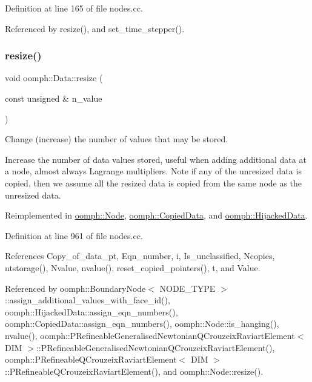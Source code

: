 Definition at line 165 of file nodes.\+cc.



Referenced by resize(), and set\+\_\+time\+\_\+stepper().

\mbox{\label{classoomph_1_1Data_ac68583834c9bef47f5c37c890960e186}} 
\subsubsection{\texorpdfstring{resize()}{resize()}}
{\footnotesize\ttfamily void oomph\+::\+Data\+::resize (\begin{DoxyParamCaption}\item[{const unsigned \&}]{n\+\_\+value }\end{DoxyParamCaption})\hspace{0.3cm}{\ttfamily [virtual]}}



Change (increase) the number of values that may be stored. 

Increase the number of data values stored, useful when adding additional data at a node, almost always Lagrange multipliers. Note if any of the unresized data is copied, then we assume all the resized data is copied from the same node as the unresized data. 

Reimplemented in \hyperlink{classoomph_1_1Node_ae6598da29d403889020ccd47a2c07cc4}{oomph\+::\+Node}, \hyperlink{classoomph_1_1CopiedData_aa7c48fb5ea17cd42260965bf2c800b3d}{oomph\+::\+Copied\+Data}, and \hyperlink{classoomph_1_1HijackedData_ae2ae3e860b36b40c133d56aae5fc39a3}{oomph\+::\+Hijacked\+Data}.



Definition at line 961 of file nodes.\+cc.



References Copy\+\_\+of\+\_\+data\+\_\+pt, Eqn\+\_\+number, i, Is\+\_\+unclassified, Ncopies, ntstorage(), Nvalue, nvalue(), reset\+\_\+copied\+\_\+pointers(), t, and Value.



Referenced by oomph\+::\+Boundary\+Node$<$ N\+O\+D\+E\+\_\+\+T\+Y\+P\+E $>$\+::assign\+\_\+additional\+\_\+values\+\_\+with\+\_\+face\+\_\+id(), oomph\+::\+Hijacked\+Data\+::assign\+\_\+eqn\+\_\+numbers(), oomph\+::\+Copied\+Data\+::assign\+\_\+eqn\+\_\+numbers(), oomph\+::\+Node\+::is\+\_\+hanging(), nvalue(), oomph\+::\+P\+Refineable\+Generalised\+Newtonian\+Q\+Crouzeix\+Raviart\+Element$<$ D\+I\+M $>$\+::\+P\+Refineable\+Generalised\+Newtonian\+Q\+Crouzeix\+Raviart\+Element(), oomph\+::\+P\+Refineable\+Q\+Crouzeix\+Raviart\+Element$<$ D\+I\+M $>$\+::\+P\+Refineable\+Q\+Crouzeix\+Raviart\+Element(), and oomph\+::\+Node\+::resize().


